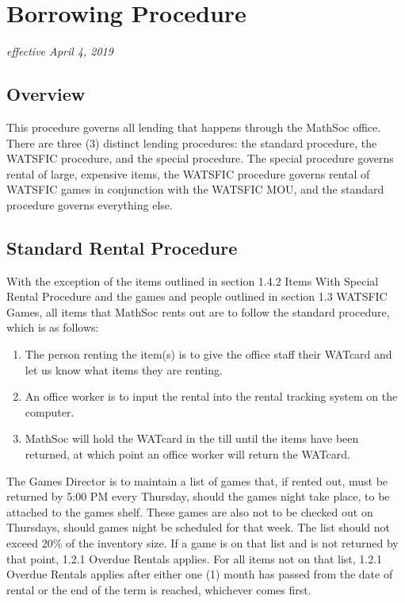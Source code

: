 \section{Borrowing Procedure}
\emph{effective April 4, 2019}

\subsection{Overview}
This procedure governs all lending that happens through the MathSoc office. There are three (3) distinct lending procedures: the standard procedure, the WATSFIC procedure, and the special procedure. The special procedure governs rental of large, expensive items, the WATSFIC procedure governs rental of WATSFIC games in conjunction with the WATSFIC MOU, and the standard procedure governs everything else.

\subsection{Standard Rental Procedure}
With the exception of the items outlined in section 1.4.2 Items With Special Rental Procedure and the games and people outlined in section 1.3 WATSFIC Games, all items that MathSoc rents out are to follow the standard procedure, which is as follows:
\begin{enumerate}
    \item The person renting the item(s) is to give the office staff their WATcard and let us know what items they are renting.
    \item An office worker is to input the rental into the rental tracking system on the computer.
    \item MathSoc will hold the WATcard in the till until the items have been returned, at which point an office worker will return the WATcard.
\end{enumerate}

The Games Director is to maintain a list of games that, if rented out, must be returned by 5:00 PM every Thursday, should the games night take place, to be attached to the games shelf. These games are also not to be checked out on Thursdays, should games night be scheduled for that week. The list should not exceed 20\% of the inventory size. If a game is on that list and is not returned by that point, 1.2.1 Overdue Rentals applies. For all items not on that list, 1.2.1 Overdue Rentals applies after either one (1) month has passed from the date of rental or the end of the term is reached, whichever comes first.

